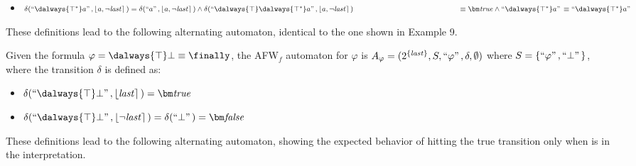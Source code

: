 \begin{example}
\begin{itemize}
        \item $\delta(\s{\dalways{\top ^*}a},\interp{a, \neg \last}) = \delta(\s{a},\interp{a, \neg \last}) \wedge \delta(\s{\dalways{\top}\dalways{\top ^*}a},\interp{a, \neg \last}) \\\phantom{\delta(\s{\dalways{\top ^*}a},\interp{a, \neg \last})} \equiv  \tpbf \wedge \s{\dalways{\top ^*}a} \equiv \s{\dalways{\top ^*}a}$ 
        
        
    \end{itemize}

    These definitions lead to the following alternating automaton, identical to the one shown in Example 9.
    

\end{example}



\begin{example}
    Given the formula $\varphi= \dalways{\top}\bot \equiv \finally$, the AFW$_f$ automaton for $\varphi$ is $A_\varphi =(2^{\{\mathit{last}\}},S,``\varphi"\,,\delta,\emptyset)$ where $S=\{``\varphi"\,,``\bot"\,\}$, where the transition $\delta$ is defined as:

    \begin{itemize}
        \item $\delta(\s{\dalways{\top}\bot},\interp{\last}) = \tpbf$ 
        \item $\delta(\s{\dalways{\top}\bot},\interp{\neg \last}) = \delta(\s{\bot}) = \fpbf$         
    \end{itemize}

    These definitions lead to the following alternating automaton, showing the expected behavior of hitting the true transition only when \last is in the interpretation.

    

\end{example}


